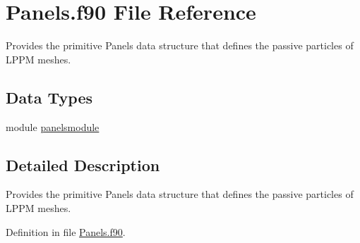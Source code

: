 \hypertarget{Panels_8f90}{\section{Panels.\+f90 File Reference}
\label{Panels_8f90}
}


Provides the primitive Panels data structure that defines the passive particles of L\+P\+P\+M meshes.  


\subsection*{Data Types}
\begin{DoxyCompactItemize}
\item 
module \hyperlink{classpanelsmodule}{panelsmodule}
\end{DoxyCompactItemize}


\subsection{Detailed Description}
Provides the primitive Panels data structure that defines the passive particles of L\+P\+P\+M meshes. 



Definition in file \hyperlink{Panels_8f90_source}{Panels.\+f90}.

